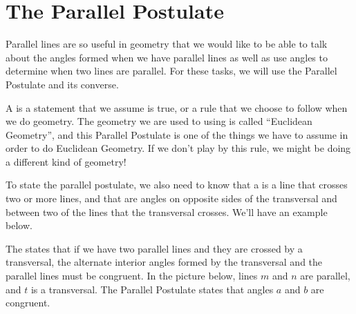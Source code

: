 \documentclass{ximera}
\begin{document}
\section{The Parallel Postulate}

Parallel lines are so useful in geometry that we would like to be able to talk about the angles formed when we have parallel lines as well as use angles to determine when two lines are parallel. For these tasks, we will use the Parallel Postulate and its converse. 

A  is a statement that we assume is true, or a rule that we choose to follow when we do geometry. The geometry we are used to using is called ``Euclidean Geometry'', and this Parallel Postulate is one of the things we have to assume in order to do Euclidean Geometry. If we don't play by this rule, we might be doing a different kind of geometry!

To state the parallel postulate, we also need to know that a  is a line that crosses two or more lines, and that  are angles on opposite sides of the transversal and between two of the lines that the transversal crosses. We'll have an example below.

\begin{definition}
The  states that if we have two parallel lines and they are crossed by a transversal, the alternate interior angles formed by the transversal and the parallel lines must be congruent. In the picture below, lines $m$ and $n$ are parallel, and $t$ is a transversal. The Parallel Postulate states that angles $a$ and $b$ are congruent.
\begin{center}
\end{center}
\end{definition}
\end{document}
